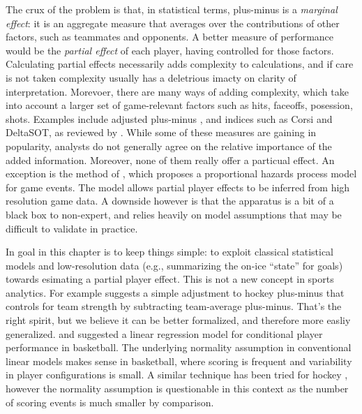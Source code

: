 The crux of the problem is that, in statistical terms, plus-minus is a {\em
marginal effect}: it is an aggregate measure that averages over the
contributions of other factors, such as teammates and opponents.  A better
measure of performance would be the {\em partial effect} of each player,
having controlled for those factors.  Calculating partial effects necessarily
adds complexity to calculations, and if care is not taken complexity usually
has a deletrious imacty on clarity of interpretation.  Morevoer, there are
many ways of adding complexity, which take into account a larger set of
game-relevant factors such as hits, faceoffs, posession, shots.  Examples
include adjusted plus-minus \cite{schlocwel10}, and indices such as Corsi and
DeltaSOT, as reviewed by \cite{vol10}.  While some of these measures are
gaining in popularity, analysts do not generally agree on the relative
importance of the added information.  Moreover, none of them really offer a
particual effect.  An exception is the method of \cite{ThoVenJen12}, which
proposes a proportional hazards process model for game events.  The model
allows partial player effects to be inferred from high resolution game data. A
downside however is that the apparatus is a bit of a black box to non-expert,
and relies heavily on model assumptions that may be difficult to validate
in practice.

In goal in this chapter is to keep things simple: to exploit classical
statistical models and low-resolution data (e.g., summarizing the on-ice
``state'' for goals) towards esimating a partial player effect.  This is not a
new concept in sports analytics.  For example \cite{awa09} suggests a simple
adjustment to hockey plus-minus that controls for team strength by subtracting
team-average plus-minus.  That's the right spirit, but we believe it can be
better formalized, and therefore more easliy generalized.  \cite{ros04} and
\cite{ilabar08} suggested a linear regression model for conditional player
performance in basketball.  The underlying normality assumption in
conventional linear models makes sense in basketball, where scoring is
frequent and variability in player configurations is small.  A similar
technique has been tried for hockey \cite{mac10}, however the normality
assumption is questionable in this context as the number of scoring events is
much smaller by comparison.

